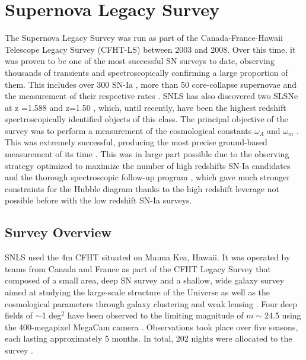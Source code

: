 \section{Supernova Legacy Survey}
The Supernova Legacy Survey \citep{Boulade2003,Pritchet2004} was run as part of the Canada-France-Hawaii Telescope Legacy Survey (CFHT-LS) between 2003 and 2008. Over this time, it was proven to be one of the most successful SN surveys to date, observing thousands of transients and spectroscopically confirming a large proportion of them. This includes over 300 SN-Ia \citep{Perrett2010}, more than 50 core-collapse supernovae and the measurement of their respective rates \citep{Perrett2012,Bazin2009}. SNLS has also discovered two SLSNe at z =1.588 and z=1.50 \citep{Howell2013}, which, until recently, have been the highest redshift spectroscopically identified objects of this class. The principal objective of the survey was to perform a measurement of the cosmological constants $\omega_{\Lambda}$ and $\omega_{m}$ \citep{Astier2006}. This was extremely successful, producing the most precise ground-based measurement of its time \citep{Sullivan2011}. This was in large part possible due to the observing strategy optimized to maximize the number of high redshifts SN-Ia candidates and the thorough spectroscopic follow-up program \citep{Bronder2007}, which gave much stronger constraints for the Hubble diagram thanks to the high redshift leverage not possible before with the low redshift SN-Ia surveys.

\subsection{Survey Overview}
SNLS used the 4m CFHT situated on Mauna Kea, Hawaii. It was operated by teams from Canada and France as part of the CFHT Legacy Survey that composed of a small area, deep SN survey and a shallow, wide galaxy survey aimed at studying the large-scale structure of the Universe as well as the cosmological parameters through galaxy clustering and weak lensing \citep{Pritchet2004,Astier2006}. Four deep fields of $\sim$1 deg$^2$ have been observed to the limiting magnitude of $m\sim$24.5 using the 400-megapixel MegaCam camera \citep{Boulade2003}. Observations took place over five seasons, each lasting approximately 5 months. In total, 202 nights were allocated to the survey \citep{Pritchet2004}.

